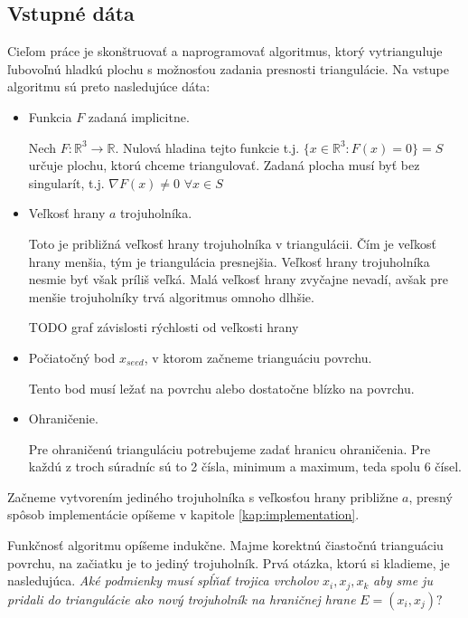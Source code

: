 \subsection{Vstupné dáta}
\label{kap:input_data}
Cieľom práce je skonštruovať a naprogramovať algoritmus, ktorý vytrianguluje ľubovoľnú hladkú plochu s 
možnosťou zadania presnosti triangulácie. Na vstupe algoritmu sú preto nasledujúce dáta:
\begin{itemize}
    \item{
        Funkcia $F$ zadaná implicitne.
        
        Nech $F:\mathbb{R}^3 \to \mathbb{R}$.
        Nulová hladina tejto funkcie t.j. $\{x \in \mathbb{R}^3 : F(x) = 0\} = S$ určuje plochu, 
        ktorú chceme triangulovať. 
        Zadaná plocha musí byť bez singularít, t.j. $\nabla F(x) \neq 0 \,\, \forall x \in S$
    }
    \item{
        Veľkosť hrany $a$ trojuholníka.

        Toto je približná veľkosť hrany trojuholníka v triangulácii. 
        Čím je veľkosť hrany menšia, tým je triangulácia presnejšia. Veľkosť hrany trojuholníka 
        nesmie byť však príliš veľká. Malá veľkosť hrany zvyčajne nevadí, avšak pre 
        menšie trojuholníky trvá algoritmus omnoho dlhšie.

        TODO graf závislosti rýchlosti od veľkosti hrany
    }
    \item{
        Počiatočný bod $x_{seed}$, v ktorom začneme trianguáciu povrchu. 

        Tento bod musí ležať na povrchu alebo dostatočne blízko na povrchu.
    }
    \item{
        Ohraničenie.

        Pre ohraničenú trianguláciu potrebujeme zadať hranicu ohraničenia. Pre každú z troch súradníc 
        sú to 2 čísla, minimum a maximum, teda spolu 6 čísel.
    }
\end{itemize}

Začneme vytvorením jediného trojuholníka s veľkosťou hrany približne $a$, presný spôsob implementácie
opíšeme v kapitole \ref{kap:implementation}.

Funkčnosť algoritmu opíšeme indukčne. Majme korektnú čiastočnú trianguáciu povrchu, na začiatku
je to jediný trojuholník. Prvá otázka, ktorú si kladieme, je nasledujúca. 
\textit{Aké podmienky musí spĺňať trojica vrcholov} $x_i, x_j, x_k$ 
\textit{aby sme ju pridali do triangulácie ako nový trojuholník na hraničnej hrane} $E = (x_i, x_j)?$ 

